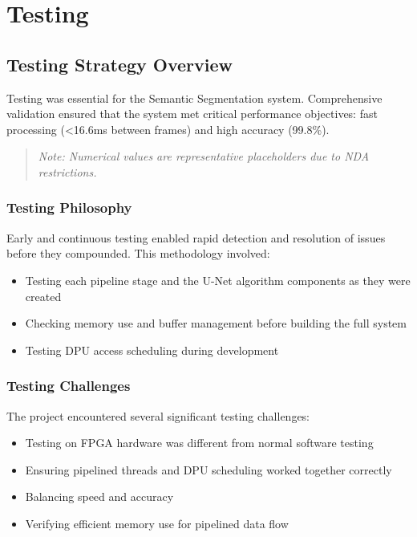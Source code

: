 \chapter{Testing}\label{chap:testing}

\section{Testing Strategy Overview}\label{sec:testing-overview}

Testing was essential for the Semantic Segmentation system. Comprehensive validation ensured that the system met critical performance objectives: fast processing (<16.6ms between frames) and high accuracy (99.8\%).

\begin{quote}
\textit{Note: Numerical values are representative placeholders due to NDA restrictions.}
\end{quote}

\subsection{Testing Philosophy}\label{subsec:testing-philosophy}

Early and continuous testing enabled rapid detection and resolution of issues before they compounded. This methodology involved:

\begin{itemize}
\item Testing each pipeline stage and the U-Net algorithm components as they were created
\item Checking memory use and buffer management before building the full system
\item Testing DPU access scheduling during development
\end{itemize}

\subsection{Testing Challenges}\label{subsec:testing-challenges}

The project encountered several significant testing challenges:

\begin{itemize}
\item Testing on FPGA hardware was different from normal software testing
\item Ensuring pipelined threads and DPU scheduling worked together correctly
\item Balancing speed and accuracy
\item Verifying efficient memory use for pipelined data flow
\end{itemize}

